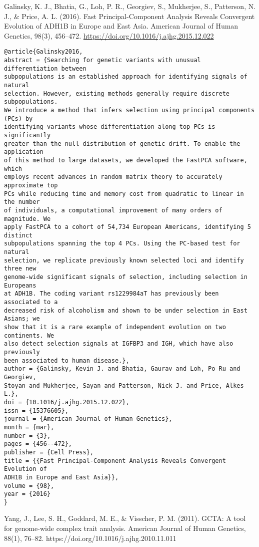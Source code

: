\documentclass[]{article}
\begin{document}
Galinsky, K. J., Bhatia, G., Loh, P. R., Georgiev, S., Mukherjee, S., Patterson, N. J., \& Price, A. L. (2016). Fast Principal-Component Analysis Reveals Convergent Evolution of ADH1B in Europe and East Asia. American Journal of Human Genetics, 98(3), 456–472. \url{https://doi.org/10.1016/j.ajhg.2015.12.022}

\begin{verbatim}
@article{Galinsky2016,
abstract = {Searching for genetic variants with unusual differentiation between
subpopulations is an established approach for identifying signals of natural
selection. However, existing methods generally require discrete subpopulations.
We introduce a method that infers selection using principal components (PCs) by
identifying variants whose differentiation along top PCs is significantly
greater than the null distribution of genetic drift. To enable the application
of this method to large datasets, we developed the FastPCA software, which
employs recent advances in random matrix theory to accurately approximate top
PCs while reducing time and memory cost from quadratic to linear in the number
of individuals, a computational improvement of many orders of magnitude. We
apply FastPCA to a cohort of 54,734 European Americans, identifying 5 distinct
subpopulations spanning the top 4 PCs. Using the PC-based test for natural
selection, we replicate previously known selected loci and identify three new
genome-wide significant signals of selection, including selection in Europeans
at ADH1B. The coding variant rs1229984aT has previously been associated to a
decreased risk of alcoholism and shown to be under selection in East Asians; we
show that it is a rare example of independent evolution on two continents. We
also detect selection signals at IGFBP3 and IGH, which have also previously
been associated to human disease.},
author = {Galinsky, Kevin J. and Bhatia, Gaurav and Loh, Po Ru and Georgiev,
Stoyan and Mukherjee, Sayan and Patterson, Nick J. and Price, Alkes L.},
doi = {10.1016/j.ajhg.2015.12.022},
issn = {15376605},
journal = {American Journal of Human Genetics},
month = {mar},
number = {3},
pages = {456--472},
publisher = {Cell Press},
title = {{Fast Principal-Component Analysis Reveals Convergent Evolution of
ADH1B in Europe and East Asia}},
volume = {98},
year = {2016}
}
\end{verbatim}

Yang, J., Lee, S. H., Goddard, M. E., \& Visscher, P. M. (2011). GCTA: A tool for genome-wide complex trait analysis. American Journal of Human Genetics, 88(1), 76–82. {https://doi.org/10.1016/j.ajhg.2010.11.011}
\end{document}

